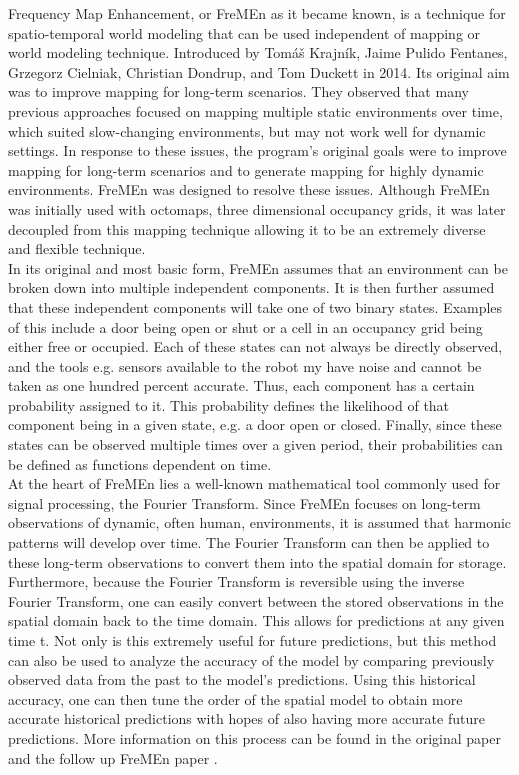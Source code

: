   Frequency Map Enhancement, or FreMEn as it became known, is a technique for
  spatio-temporal world modeling that can be used independent of mapping or
  world modeling technique. Introduced by Tomáš Krajník, Jaime Pulido
  Fentanes, Grzegorz Cielniak, Christian Dondrup, and Tom Duckett in 2014. Its
  original aim was to improve mapping for long-term scenarios.
  They observed that many previous approaches focused on mapping multiple
  static environments over time, which suited slow-changing environments, but
  may not work well for dynamic settings. In response to these issues, the
  program's original goals were to improve mapping for long-term scenarios and
  to generate mapping for highly dynamic environments. FreMEn was designed to
  resolve these issues. \cite{Fentanes2014} Although FreMEn was initially used with
  octomaps, three dimensional occupancy grids, it was later decoupled from
  this mapping technique allowing it to be an extremely diverse and flexible
  technique. \\

  In its original and most basic form, FreMEn assumes that an environment can be
  broken down into multiple independent components. It is then further assumed
  that these independent components will take one of two binary states. Examples
  of this include a door being open or shut or a cell in
  an occupancy grid being either free or occupied. Each of these states can not
  always be directly observed, and the tools e.g. sensors available to the robot
  my have noise and cannot be taken as one hundred percent accurate. Thus,
  each component has a certain probability assigned to it. This
  probability defines the likelihood of that component being in a given state, e.g. a door
  open or closed. Finally, since these states can be observed multiple times
  over a given period, their probabilities can be defined as
  functions dependent on time. \\

  At the heart of FreMEn lies a well-known mathematical tool commonly used for
  signal processing, the Fourier Transform. Since FreMEn focuses on long-term
  observations of dynamic, often human, environments, it is assumed that harmonic
  patterns will develop over time. The Fourier Transform can then be applied to
  these long-term observations to convert them into the spatial domain for
  storage. Furthermore, because the Fourier Transform is reversible
  using the inverse Fourier Transform, one can easily convert between the stored
  observations in the spatial domain back to the time domain. This allows for
  predictions at any given time t. Not only is this extremely useful for future
  predictions, but this method can also be used to analyze the accuracy of the
  model by comparing previously observed data from the past to the model's
  predictions. Using this historical accuracy, one can then tune the order of the
  spatial model to obtain more accurate historical predictions with hopes of
  also having more accurate future predictions. More information on this process
  can be found in the original paper\cite{Fentanes2014} and the follow up FreMEn
  paper \cite{Krajnik2015}. \\

